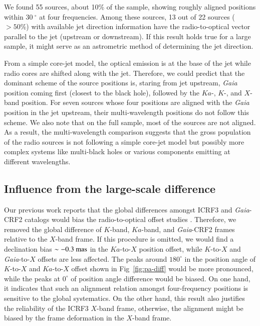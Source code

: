 \documentclass[referee]{aa}        %
\begin{document}
    We found 55 sources, about 10\% of the sample, showing roughly aligned positions within $30~^\circ$ at four frequencies.
    Among these sources, 13 out of 22 sources ($>50\%$) with available jet direction information have the radio-to-optical vector parallel to the jet (upstream or downstream).
    If this result holds true for a large sample, it might serve as an astrometric method of determining the jet direction.

    From a simple core-jet model, the optical emission is at the base of the jet while radio cores are shifted along with the jet.
    Therefore, we could predict that the dominant scheme of the source positions is, staring from jet upstream, \textit{Gaia} position coming first (closest to the black hole), followed by the $Ka$-, $K$-, and $X$-band position.
    For seven sources whose four positions are aligned with the \textit{Gaia} position in the jet upstream, their multi-wavelength positions do not follow this scheme.
    We also note that on the full sample, most of the sources are not aligned.
    As a result, the multi-wavelength comparison suggests that the gross population of the radio sources is not following a simple core-jet model but possibly more complex systems like multi-black holes or various components emitting at different wavelengths.


\subsection{Influence from the large-scale difference} \label{subsec:sys-effect}

    Our previous work reports that the global differences amongst ICRF3 and \textit{Gaia}-CRF2 catalogs would bias the radio-to-optical offset studies \citep{2020A&A...634A..28L}.
    Therefore, we removed the global difference of $K$-band, $Ka$-band, and \textit{Gaia}-CRF2 frames relative to the $X$-band frame.
    If this procedure is omitted, we would find a declination bias $\sim-0.3~{\rm mas}$ in the $Ka$-to-$X$ position offset, while $K$-to-$X$ and \textit{Gaia}-to-$X$ offsets are less affected.
    The peaks around $180^\circ$ in the position angle of $K$-to-$X$ and $Ka$-to-$X$ offset shown in Fig~\ref{fig:pa-diff} would be more pronounced, while the peaks at $0^\circ$ of position angle difference would be biased.
    On one hand, it indicates that such an alignment relation amongst four-frequency positions is sensitive to the global systematics.
    On the other hand, this result also justifies the reliability of the ICRF3 $X$-band frame, otherwise, the alignment might be biased by the frame deformation in the $X$-band frame.
\end{document}
